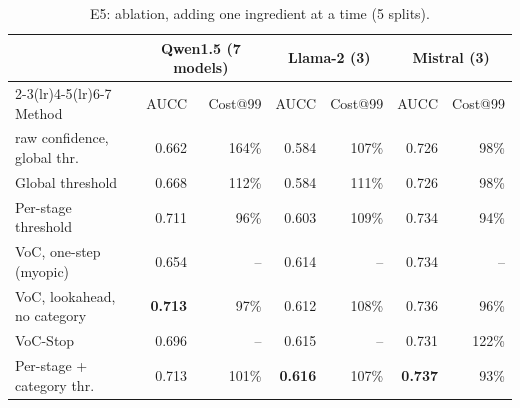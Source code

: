 \begin{table}[t]\centering\small
\caption{E5: ablation, adding one ingredient at a time (5 splits).}\label{tab:ablation}
\begin{tabular}{lrrrrrr}\toprule
 & \multicolumn{2}{c}{Qwen1.5 (7 models)} & \multicolumn{2}{c}{Llama-2 (3)} & \multicolumn{2}{c}{Mistral (3)}\\
\cmidrule(lr){2-3}\cmidrule(lr){4-5}\cmidrule(lr){6-7}
Method & AUCC & Cost@99 & AUCC & Cost@99 & AUCC & Cost@99\\\midrule
raw confidence, global thr. & 0.662 & 164\% & 0.584 & 107\% & 0.726 & 98\%\\
Global threshold & 0.668 & 112\% & 0.584 & 111\% & 0.726 & 98\%\\
Per-stage threshold & 0.711 & 96\% & 0.603 & 109\% & 0.734 & 94\%\\
VoC, one-step (myopic) & 0.654 & -- & 0.614 & -- & 0.734 & --\\
VoC, lookahead, no category & \textbf{0.713} & 97\% & 0.612 & 108\% & 0.736 & 96\%\\
VoC-Stop & 0.696 & -- & 0.615 & -- & 0.731 & 122\%\\
Per-stage + category thr. & 0.713 & 101\% & \textbf{0.616} & 107\% & \textbf{0.737} & 93\%\\
\bottomrule\end{tabular}
\end{table}
